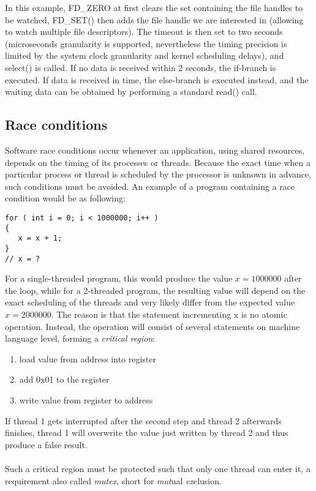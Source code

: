 In this example, FD\_ZERO at first clears the set containing the file handles to be watched, FD\_SET() then adds the file handle we are interested in (allowing to watch multiple file
descriptors). The timeout is then set to two seconds 
(microseconds granularity is supported, nevertheless the timing precision is limited by the system clock granularity and kernel scheduling delays), and select() is called. If no data is
received within 2 seconds, the if-branch is executed. If data is received in time, the else-branch is executed instead, and the waiting data can be obtained by performing a standard
read() call.

\subsection{Race conditions}
Software race conditions occur whenever an application, using shared resources, depends on the timing of its processes or threads.
Because the exact time when a particular process or thread is scheduled by the processor is unknown in advance, such conditions must be avoided.
An example of a program containing a race condition would be as following:
\begin{lstlisting}[style=cStyle,caption={Race condition},label=lst:raceCond]
for ( int i = 0; i < 1000000; i++ )
{
   x = x + 1; 
}
// x = ?
\end{lstlisting}
For a single-threaded program, this would produce the value $x=1000000$ after the loop, while for a 2-threaded program, the resulting value will depend on the exact scheduling of the
threads and very likely differ from the expected value $x=2000000$. The reason is that the statement incrementing x is no atomic operation. Instead, the operation will consist of
several statements on machine language level, forming a \textit{critical region}:
\begin{enumerate}
 \item load value from address into register
 \item add 0x01 to the register
 \item write value from register to address
\end{enumerate}
If thread 1 gets interrupted after the second step and thread 2 afterwards finishes, thread 1 will overwrite the value just written by thread 2 and thus produce a false result.
\\
\\
Such a critical region must be protected such that only one thread can enter it, a requirement also called \textit{mutex}, short for \textit{mut}ual \textit{ex}clusion.
